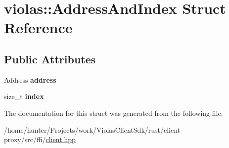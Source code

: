 \hypertarget{structviolas_1_1_address_and_index}{}\section{violas\+:\+:Address\+And\+Index Struct Reference}
\label{structviolas_1_1_address_and_index}
\subsection*{Public Attributes}
\begin{DoxyCompactItemize}
\item 
\mbox{\label{structviolas_1_1_address_and_index_ae713c0d5efc15139420bfe5451b1fede}} 
Address {\bfseries address}
\item 
\mbox{\label{structviolas_1_1_address_and_index_a7ae0b501fcdb2e3b340f52cd90f039d9}} 
size\+\_\+t {\bfseries index}
\end{DoxyCompactItemize}


The documentation for this struct was generated from the following file\+:\begin{DoxyCompactItemize}
\item 
/home/hunter/\+Projects/work/\+Violas\+Client\+Sdk/rust/client-\/proxy/src/ffi/\hyperlink{client_8hpp}{client.\+hpp}\end{DoxyCompactItemize}
